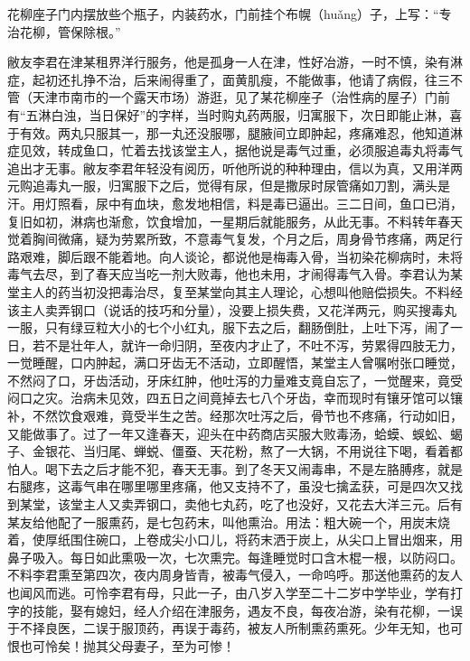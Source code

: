 \documentclass[12pt,UTF8]{ctexbook}
\begin{document}
花柳座子门内摆放些个瓶子，内装药水，门前挂个布幌（huǎng）子，上写：“专治花柳，管保除根。”



敝友李君在津某租界洋行服务，他是孤身一人在津，性好冶游，一时不慎，染有淋症，起初还扎挣不治，后来闹得重了，面黄肌瘦，不能做事，他请了病假，往三不管（天津市南市的一个露天市场）游逛，见了某花柳座子（治性病的屋子）门前有“五淋白浊，当日保好”的字样，当时购丸药两服，归寓服下，次日即能止淋，喜于有效。两丸只服其一，那一丸还没服哪，腿腋间立即肿起，疼痛难忍，他知道淋症见效，转成鱼口，忙着去找该堂主人，据他说是毒气过重，必须服追毒丸将毒气追出才无事。敝友李君年轻没有阅历，听他所说的种种理由，信以为真，又用洋两元购追毒丸一服，归寓服下之后，觉得有尿，但是撒尿时尿管痛如刀割，满头是汗。用灯照看，尿中有血块，愈发地相信，料是毒已逼出。三二日间，鱼口已消，复旧如初，淋病也渐愈，饮食增加，一星期后就能服务，从此无事。不料转年春天觉着胸间微痛，疑为劳累所致，不意毒气复发，个月之后，周身骨节疼痛，两足行路艰难，脚后跟不能着地。向人谈论，都说他是梅毒入骨，当初染花柳病时，未将毒气去尽，到了春天应当吃一剂大败毒，他也未用，才闹得毒气入骨。李君认为某堂主人的药当初没把毒治尽，复至某堂向其主人理论，心想叫他赔偿损失。不料经该主人卖弄钢口（说话的技巧和分量），没要上损失费，又花洋两元，购买搜毒丸一服，只有绿豆粒大小的七个小红丸，服下去之后，翻肠倒肚，上吐下泻，闹了一日，若不是壮年人，就许一命归阴，至夜内才止了，不吐不泻，劳累得四肢无力，一觉睡醒，口内肿起，满口牙齿无不活动，立即醒悟，某堂主人曾嘱咐张口睡觉，不然闷了口，牙齿活动，牙床红肿，他吐泻的力量难支竟自忘了，一觉醒来，竟受闷口之灾。治病未见效，四五日之间竟掉去七八个牙齿，幸而现时有镶牙馆可以镶补，不然饮食艰难，竟受半生之苦。经那次吐泻之后，骨节也不疼痛，行动如旧，又能做事了。过了一年又逢春天，迎头在中药商店买服大败毒汤，蛤蟆、蜈蚣、蝎子、金银花、当归尾、蝉蜕、僵蚕、天花粉，熬了一大锅，不用说往下喝，看着都怕人。喝下去之后才能不犯，春天无事。到了冬天又闹毒串，不是左胳膊疼，就是右腿疼，这毒气串在哪里哪里疼痛，他又支持不了，虽没七擒孟获，可是四次又找到某堂，该堂主人又卖弄钢口，卖他七丸药，吃了也没好，又花去大洋三元。后有某友给他配了一服熏药，是七包药末，叫他熏治。用法：粗大碗一个，用炭末烧着，使厚纸围住碗口，上卷成尖小口儿，将药末洒于炭上，从尖口上冒出烟来，用鼻子吸入。每日如此熏吸一次，七次熏完。每逢睡觉时口含木棍一根，以防闷口。不料李君熏至第四次，夜内周身皆青，被毒气侵入，一命呜呼。那送他熏药的友人也闻风而逃。可怜李君有母，只此一子，由八岁入学至二十二岁中学毕业，学有打字的技能，娶有媳妇，经人介绍在津服务，遇友不良，每夜冶游，染有花柳，一误于不择良医，二误于服顶药，再误于毒药，被友人所制熏药熏死。少年无知，也可恨也可怜矣！抛其父母妻子，至为可惨！
\end{document}
